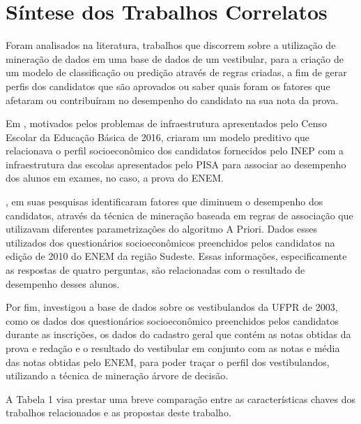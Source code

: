 \section{Síntese dos Trabalhos Correlatos}

\par
Foram analisados na literatura, trabalhos que discorrem sobre a utilização de mineração de dados em uma base de dados de um vestibular, para a criação de um modelo de classificação ou predição através de regras criadas, a fim de gerar perfis dos candidatos que são aprovados ou saber quais foram os fatores que afetaram ou contribuíram no desempenho do candidato na sua nota da prova.

\par
Em , motivados pelos problemas de infraestrutura apresentados pelo Censo Escolar da Educação Básica de 2016, criaram um modelo preditivo que relacionava o perfil socioeconômico dos candidatos fornecidos pelo INEP com a infraestrutura das escolas apresentados pelo PISA para associar ao desempenho dos alunos em exames, no caso, a prova do ENEM.

\par
{}, em suas pesquisas identificaram fatores que diminuem o desempenho dos candidatos, através da técnica de mineração baseada em regras de associação que utilizavam diferentes parametrizações do algoritmo A Priori. Dados esses utilizados dos questionários socioeconômicos preenchidos pelos candidatos na edição de 2010 do ENEM da região Sudeste. Essas informações, especificamente as respostas de quatro perguntas, são relacionadas com o resultado de desempenho desses alunos.

\par
Por fim,  investigou a base de dados sobre os vestibulandos da UFPR de 2003, como os dados dos questionários socioeconômico preenchidos pelos candidatos durante as inscrições, os dados do cadastro geral que contém as notas obtidas da prova e redação e o resultado do vestibular em conjunto com as notas e média das notas obtidas pelo ENEM, para poder traçar o perfil dos vestibulandos, utilizando a técnica de mineração árvore de decisão.

\par
A Tabela 1 visa prestar uma breve comparação entre as características chaves dos trabalhos relacionados e as propostas deste trabalho.

